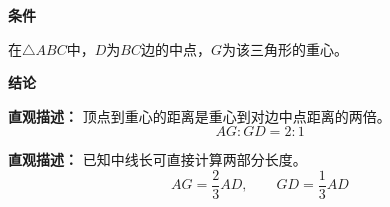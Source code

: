 \begin{statementbox}
	\textbf{\textcolor{CStatement}{条件}}
	\begin{description}[style=nextline, leftmargin=2.8em, labelsep=0.5em, itemsep=0.35em]
		\item[\textbf{\textcolor{CStatement}{条件1（任意三角形）：}}] 在\(\triangle ABC\)中，\(D\)为\(BC\)边的中点，\(G\)为该三角形的重心。
	\end{description}

	\textbf{\textcolor{CStatement}{结论}}
	\begin{description}[style=nextline, leftmargin=2.8em, labelsep=0.5em, itemsep=0.45em]
		\item[\textbf{\textcolor{CStatement}{结论一（比例关系）：}}]
		      \textbf{\textcolor{CStatement}{直观描述：}}
		      顶点到重心的距离是重心到对边中点距离的两倍。
		      \[
			      \boxed{AG:GD = 2:1}
		      \]

		\item[\textbf{\textcolor{CStatement}{推广结论（长度公式）：}}]
		      \textbf{\textcolor{CStatement}{直观描述：}}
		      已知中线长可直接计算两部分长度。
		      \[
			      AG = \frac{2}{3} AD,
			      \qquad
			      GD = \frac{1}{3} AD
		      \]
	\end{description}
\end{statementbox}